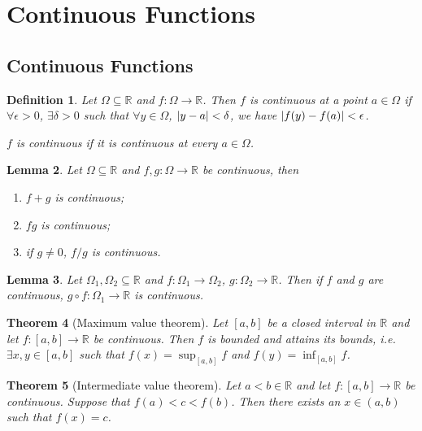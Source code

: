 \documentclass{article}
\theoremstyle{plain}\theoremheaderfont{\normalfont\itshape}\theorembodyfont{\rmfamily}\theoremseparator{.}\newtheorem*{rem}{Remark}\newtheorem*{ex}{Example}\newtheorem*{proof}{Proof}\newtheorem*{altp}{Alternative proof}
\theoremstyle{plain}\theoremheaderfont{\normalfont\bfseries}\theorembodyfont{\rmfamily}\theoremseparator{.}\newtheorem{thm}{Theorem}[section]\newtheorem{lem}[thm]{Lemma}\newtheorem{prop}[thm]{Proposition}\newtheorem*{cor}{Corollary}\newtheorem{defn}[thm]{Definition}\newtheorem{clm}[thm]{Claim}\newtheorem{clminproof}{Claim}
\theoremstyle{break}\theoremheaderfont{\normalfont\itshape}\theorembodyfont{\rmfamily}\theoremseparator{.\medskip}\newtheorem*{proofskip}{Proof}\newtheorem*{exs}{Examples}\newtheorem*{rems}{Remarks}
\theoremstyle{break}\theoremheaderfont{\normalfont\bfseries}\theorembodyfont{\rmfamily}\theoremseparator{.\medskip}\newtheorem{lemskip}[thm]{Lemma}\newtheorem{defnskip}[thm]{Definition}\newtheorem{propskip}[thm]{Proposition}\newtheorem{thmskip}[thm]{Theorem}
\begin{document}
    \section{Continuous Functions}
    \subsection{Continuous Functions}
    \begin{defn}
        Let \(\Omega\subseteq\mathbb{R}\) and \(f:\Omega\to\mathbb{R}\). Then \(f\) is \textit{continuous} at a point \(a\in\Omega\) if \(\forall\epsilon>0\), \(\exists\delta>0\) such that \(\forall y\in\Omega\), \(\abs{y-a}<\delta\), we have \(\abs{f(y)-f(a)}<\epsilon\).
        
        \(f\) is \textit{continuous} if it is continuous at every \(a\in\Omega\).
    \end{defn}
    \begin{lem}
        Let \(\Omega\subseteq\mathbb{R}\) and \(f,g:\Omega\to\mathbb{R}\) be continuous, then
        \begin{enumerate}[topsep=0pt,label=(\roman*)]
            \item \(f+g\) is continuous;
            \item \(fg\) is continuous;
            \item if \(g\ne 0\), \(f/g\) is continuous.
        \end{enumerate}
    \end{lem}
    \begin{lem}
        Let \(\Omega_1,\Omega_2\subseteq\mathbb{R}\) and \(f:\Omega_1\to\Omega_2\), \(g:\Omega_2\to\mathbb{R}\). Then if \(f\) and \(g\) are continuous, \(g\circ f:\Omega_1\to\mathbb{R}\) is continuous.
    \end{lem}
    \begin{thm}[Maximum value theorem]
        Let \([a,b]\) be a closed interval in \(\mathbb{R}\) and let \(f:[a,b]\to\mathbb{R}\) be continuous. Then \(f\) is bounded and attains its bounds, i.e. \(\exists x,y\in[a,b]\) such that \(f(x)=\sup_{[a,b]} f\) and \(f(y)=\inf_{[a,b]} f\).
    \end{thm}
    \begin{thm}[Intermediate value theorem]
        Let \(a<b\in\mathbb{R}\) and let \(f:[a,b]\to\mathbb{R}\) be continuous. Suppose that \(f(a)<c<f(b)\). Then there exists an \(x\in(a,b)\) such that \(f(x)=c\).
    \end{thm}
\end{document}
